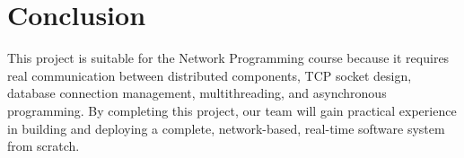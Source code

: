 \documentclass[11pt]{article}
\begin{document}
\section{Conclusion}

This project is suitable for the Network Programming course because it requires real communication between distributed components, TCP socket design, database connection management, multithreading, and asynchronous programming. By completing this project, our team will gain practical experience in building and deploying a complete, network-based, real-time software system from scratch.
\end{document}
